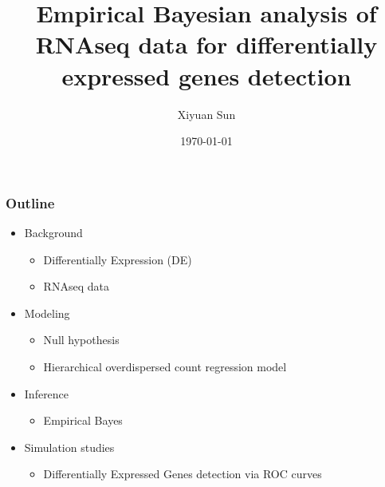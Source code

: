 \documentclass[handout,10pt]{beamer}
\institute[ISU]{Iowa State University}
\date{\today}
\title[Differential Expression Analysis Methods Comparison]{Empirical Bayesian analysis of RNAseq data for differentially expressed genes detection}
\author{Xiyuan Sun}
\begin{document}



\begin{frame}
\frametitle{Outline}

\begin{itemize}
\item Background
	\begin{itemize}
	\item Differentially Expression (DE)
	\item RNAseq data \pause
	\end{itemize}
\item Modeling 
	\begin{itemize}
	\item Null hypothesis \pause
	\item Hierarchical overdispersed count regression model \pause
	\end{itemize}
\item Inference
	\begin{itemize}
	\item Empirical Bayes
	\end{itemize}
\item Simulation studies
	\begin{itemize}
	\item Differentially Expressed Genes detection via ROC curves \pause
	\end{itemize}
\end{itemize}

\end{frame}
\end{document}
